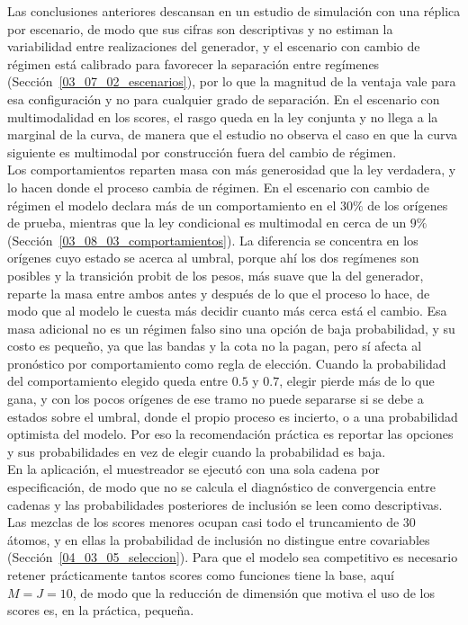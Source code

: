 Las conclusiones anteriores descansan en un estudio de simulación con una réplica por escenario, de modo que sus cifras son descriptivas y no estiman la variabilidad entre realizaciones del generador, y el escenario con cambio de régimen está calibrado para favorecer la separación entre regímenes (Sección~\ref{03_07_02_escenarios}), por lo que la magnitud de la ventaja vale para esa configuración y no para cualquier grado de separación. En el escenario con multimodalidad en los scores, el rasgo queda en la ley conjunta y no llega a la marginal de la curva, de manera que el estudio no observa el caso en que la curva siguiente es multimodal por construcción fuera del cambio de régimen.\\

Los comportamientos reparten masa con más generosidad que la ley verdadera, y lo hacen donde el proceso cambia de régimen. En el escenario con cambio de régimen el modelo declara más de un comportamiento en el $30\%$ de los orígenes de prueba, mientras que la ley condicional es multimodal en cerca de un $9\%$ (Sección~\ref{03_08_03_comportamientos}). La diferencia se concentra en los orígenes cuyo estado se acerca al umbral, porque ahí los dos regímenes son posibles y la transición probit de los pesos, más suave que la del generador, reparte la masa entre ambos antes y después de lo que el proceso lo hace, de modo que al modelo le cuesta más decidir cuanto más cerca está el cambio. Esa masa adicional no es un régimen falso sino una opción de baja probabilidad, y su costo es pequeño, ya que las bandas y la cota no la pagan, pero sí afecta al pronóstico por comportamiento como regla de elección. Cuando la probabilidad del comportamiento elegido queda entre $0.5$ y $0.7$, elegir pierde más de lo que gana, y con los pocos orígenes de ese tramo no puede separarse si se debe a estados sobre el umbral, donde el propio proceso es incierto, o a una probabilidad optimista del modelo. Por eso la recomendación práctica es reportar las opciones y sus probabilidades en vez de elegir cuando la probabilidad es baja.\\

En la aplicación, el muestreador se ejecutó con una sola cadena por especificación, de modo que no se calcula el diagnóstico de convergencia entre cadenas y las probabilidades posteriores de inclusión se leen como descriptivas. Las mezclas de los scores menores ocupan casi todo el truncamiento de 30 átomos, y en ellas la probabilidad de inclusión no distingue entre covariables (Sección~\ref{04_03_05_seleccion}). Para que el modelo sea competitivo es necesario retener prácticamente tantos scores como funciones tiene la base, aquí $M = J = 10$, de modo que la reducción de dimensión que motiva el uso de los scores es, en la práctica, pequeña.\\

